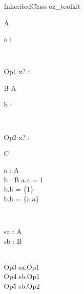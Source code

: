\begin{zsection}
  \SECTION InheritedClass \parents oz\_toolkit
\end{zsection}

\begin{class}{A}
  \begin{state}
    a : \nat
  \end{state}\\
  \begin{op}{Op1}
    x? : \nat
  \end{op}
\end{class}

\begin{class}{B}
  A\\
  \begin{state}
    b : \power \nat
  \end{state}\\
  \begin{op}{Op2}
    x? : \power \nat
  \end{op}
\end{class}

\begin{class}{C}
  \begin{axdef}
    a : \poly A\\
    b : B
  \where
    a.a = 1\\
    b.b = \{1\}\\
    b.b = \{a.a\}
  \end{axdef}\\
  \begin{state}
    sa : \poly A\\
    sb : B
  \end{state}\\
  Op3 \sdef sa.Op1\\
  Op4 \sdef sb.Op1\\
  Op5 \sdef sb.Op2
\end{class}
